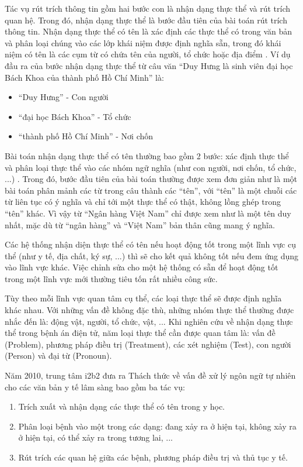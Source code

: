 Tác vụ rút trích thông tin gồm hai bước con là nhận dạng thực thể và rút trích quan hệ. Trong đó, nhận dạng thực thể là bước đầu tiên của bài toán rút trích thông tin. Nhận dạng thực thể có tên là xác định các thực thể có trong văn bản và phân loại chúng vào các lớp khái niệm được định nghĩa sẵn, trong đó khái niệm có tên là các cụm từ có chứa tên của người, tổ chức hoặc địa điểm \cite{KimSang2003}. Ví dụ đầu ra của bước nhận dạng thực thể từ câu văn ``Duy Hưng là sinh viên đại học Bách Khoa của thành phố Hồ Chí Minh'' là:

\begin{itemize}
\item ``Duy Hưng'' - Con người
\item ``đại học Bách Khoa'' - Tổ chức
\item ``thành phố Hồ Chí Minh'' - Nơi chốn
\end{itemize}

Bài toán nhận dạng thực thể có tên thường bao gồm 2 bước: xác định thực thể và phân loại thực thể vào các nhóm ngữ nghĩa (như con người, nơi chốn, tổ chức, ...) \cite{KimSang2003}. Trong đó, bước đầu tiên của bài toán thường được xem đơn giản như là một bài toán phân mảnh các từ trong câu thành các ``tên'', với ``tên'' là một chuỗi các từ liên tục có ý nghĩa và chỉ tới một thực thể có thật, không lồng ghép trong ``tên'' khác. Vì vậy từ ``Ngân hàng Việt Nam'' chỉ được xem như là một tên duy nhất, mặc dù từ ``ngân hàng'' và ``Việt Nam'' bản thân cũng mang ý nghĩa.

Các hệ thống nhận diện thực thể có tên nếu hoạt động tốt trong một lĩnh vực cụ thể (như y tế, địa chất, ký sự, ...) thì sẽ cho kết quả không tốt nếu đem ứng dụng vào lĩnh vực khác. Việc chỉnh sửa cho một hệ thống có sẵn để hoạt động tốt trong một lĩnh vực mới thường tiêu tốn rất nhiều công sức.

Tùy theo mỗi lĩnh vực quan tâm cụ thể, các loại thực thể sẽ được định nghĩa khác nhau. Với những vấn đề không đặc thù, những nhóm thực thể thường được nhắc đến là: động vật, người, tổ chức, vật, ... Khi nghiên cứu về nhận dạng thực thể trong bệnh án điện tử, năm loại thực thể cần được quan tâm là: vấn đề (Problem), phương pháp điều trị (Treatment), các xét nghiệm (Test), con người (Person) và đại từ (Pronoun).

Năm 2010, trung tâm i2b2 đưa ra Thách thức về vấn đề xử lý ngôn ngữ tự nhiên cho các văn bản y tế lâm sàng bao gồm ba tác vụ:

\begin{enumerate}
\item Trích xuất và nhận dạng các thực thể có tên trong y học.
\item Phân loại bệnh vào một trong các dạng: đang xảy ra ở hiện tại, không xảy ra ở hiện tại, có thể xảy ra trong tương lai, ...
\item Rút trích các quan hệ giữa các bệnh, phương pháp điều trị và thủ tục y tế.
\end{enumerate}


